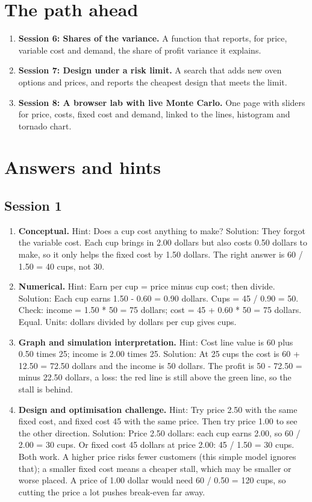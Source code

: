 \documentclass[11pt,a4paper]{article}
\begin{document}
\section{The path ahead}
\begin{enumerate}[nosep]
\item \textbf{Session 6: Shares of the variance.} A function that reports, for price, variable cost and demand, the share of profit variance it explains.
\item \textbf{Session 7: Design under a risk limit.} A search that adds new oven options and prices, and reports the cheapest design that meets the limit.
\item \textbf{Session 8: A browser lab with live Monte Carlo.} One page with sliders for price, costs, fixed cost and demand, linked to the lines, histogram and tornado chart.
\end{enumerate}

\section{Answers and hints}

\subsection*{Session 1}
\begin{enumerate}[nosep]
\item \textbf{Conceptual.} Hint: Does a cup cost anything to make? Solution: They forgot the variable cost. Each cup brings in 2.00 dollars but also costs 0.50 dollars to make, so it only helps the fixed cost by 1.50 dollars. The right answer is 60 / 1.50 = 40 cups, not 30.
\item \textbf{Numerical.} Hint: Earn per cup = price minus cup cost; then divide. Solution: Each cup earns 1.50 - 0.60 = 0.90 dollars. Cups = 45 / 0.90 = 50. Check: income = 1.50 * 50 = 75 dollars; cost = 45 + 0.60 * 50 = 75 dollars. Equal. Units: dollars divided by dollars per cup gives cups.
\item \textbf{Graph and simulation interpretation.} Hint: Cost line value is 60 plus 0.50 times 25; income is 2.00 times 25. Solution: At 25 cups the cost is 60 + 12.50 = 72.50 dollars and the income is 50 dollars. The profit is 50 - 72.50 = minus 22.50 dollars, a loss: the red line is still above the green line, so the stall is behind.
\item \textbf{Design and optimisation challenge.} Hint: Try price 2.50 with the same fixed cost, and fixed cost 45 with the same price. Then try price 1.00 to see the other direction. Solution: Price 2.50 dollars: each cup earns 2.00, so 60 / 2.00 = 30 cups. Or fixed cost 45 dollars at price 2.00: 45 / 1.50 = 30 cups. Both work. A higher price risks fewer customers (this simple model ignores that); a smaller fixed cost means a cheaper stall, which may be smaller or worse placed. A price of 1.00 dollar would need 60 / 0.50 = 120 cups, so cutting the price a lot pushes break-even far away.
\end{enumerate}
\end{document}
